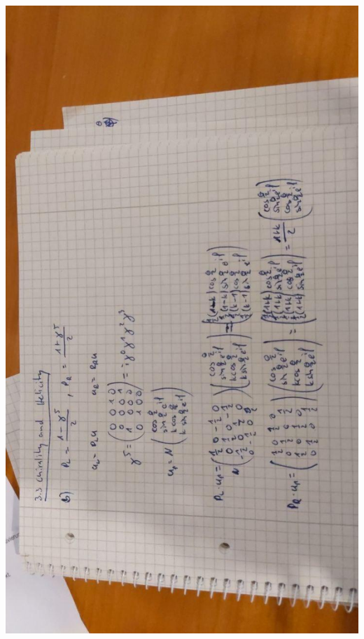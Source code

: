 \documentclass{article}
\begin{document}
    \includegraphics[angle=270,width=\textwidth]{3.jpg}\\
\end{document}
